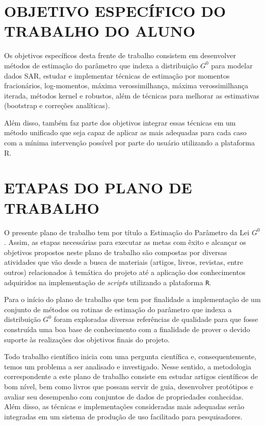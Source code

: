 \documentclass[12pt]{article}
\begin{document}
\newpage
\section*{\centering \textbf{OBJETIVO ESPECÍFICO DO TRABALHO DO ALUNO}}

\vspace{0.5cm}

Os objetivos específicos desta frente de trabalho consistem em desenvolver métodos de estimação do parâmetro que indexa a distribuição $G^{0}$ para modelar dados SAR, estudar e implementar técnicas de estimação por momentos fracionários, log-momentos, máxima verossimilhança, máxima verossimilhança iterada, métodos kernel e robustos, além de técnicas para melhorar as estimativas (bootstrap e correções analíticas). 

Além disso, também faz parte dos objetivos integrar essas técnicas em um método unificado que seja capaz de aplicar as mais adequadas para cada caso com a mínima intervenção possível por parte do usuário utilizando a plataforma R.

\newpage
\section*{\centering \textbf{ETAPAS DO PLANO DE TRABALHO}}

\vspace{0.5cm}

O presente plano de trabalho tem por título a Estimação do Parâmetro da Lei $G^{0}$. Assim, as etapas necessárias para executar as metas com êxito e alcançar os objetivos propostos neste plano de trabalho são compostas por diversas atividades que vão desde a busca de materiais (artigos, livros, revistas, entre outros) relacionados à temática do projeto até a aplicação dos conhecimentos adquiridos na implementação de \textit{scripts} utilizando a plataforma \texttt{R}. 

Para o início do plano de trabalho que tem por finalidade a implementação de um conjunto de métodos ou rotinas de estimação do parâmetro que indexa a distribuição $G^{0}$ foram exploradas diversas referências de qualidade para que fosse construída uma boa base de conhecimento com a finalidade de prover o devido suporte às realizações dos objetivos finais do projeto.

Todo trabalho científico inicia com uma pergunta científica e, consequentemente, temos um problema a ser analisado e investigado. Nesse sentido, a metodologia correspondente a este plano de trabalho consiste em estudar artigos científicos de bom nível, bem como livros que possam servir de guia, desenvolver protótipos e avaliar seu desempenho com conjuntos de dados de propriedades conhecidas. Além disso, as técnicas e implementações consideradas mais adequadas serão integradas em um sistema de produção de uso facilitado para pesquisadores. 
\end{document}
